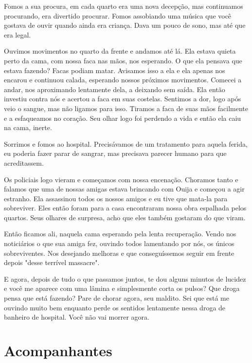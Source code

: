 \documentclass{book}
\begin{document}
\begin{multicols}{2}
 Fomos a sua procura, em cada quarto era uma nova decepção, mas continuamos procurando, era divertido procurar. Fomos assobiando uma música que você gostava de ouvir quando ainda era criança. Dava um pouco de sono, mas até que era legal.
 
 Ouvimos movimentos no quarto da frente e andamos até lá. Ela estava quieta perto da cama, com nossa faca nas mãos, nos esperando. O que ela pensava que estava fazendo? Facas podiam matar. Avisamos isso a ela e ela apenas nos encarou e continuou calada, esperando nossos próximos movimentos. Comecei a andar, nos aproximando lentamente dela, a deixando sem saída. Ela então investiu contra nós e acertou a faca em suas costelas. Sentimos a dor, logo após veio o sangue, mas não ligamos para isso. Tiramos a faca de suas mãos facilmente e a esfaqueamos no coração. Seu olhar logo foi perdendo a vida e então ela caiu na cama, inerte.
 
 Sorrimos e fomos ao hospital. Precisávamos de um tratamento para aquela ferida, eu poderia fazer parar de sangrar, mas precisava parecer humano para que acreditassem.
 
 Os policiais logo vieram e começamos com nossa encenação. Choramos tanto e falamos que uma de nossas amigas estava brincando com Ouija e começou a agir estranho. Ela assassinou todos os nossos amigos e eu tive que mata-la para sobreviver. Eles então foram para a casa encontraram nossa obra espalhada pelos quartos. Seus olhares de surpresa, acho que eles também gostaram do que viram.
 
 Então ficamos ali, naquela cama esperando pela lenta recuperação. Vendo nos noticiários o que sua amiga fez, ouvindo todos lamentando por nós, os únicos sobreviventes. Nos desejando melhoras e que conseguíssemos seguir em frente depois "desse terrível massacre".
 
 E agora, depois de tudo o que passamos juntos, te dou alguns minutos de lucidez e você me aparece com uma lâmina e simplesmente corta os pulsos? Que droga pensa que está fazendo? Pare de chorar agora, seu maldito. Sei que está me ouvindo muito bem enquanto perde os sentidos lentamente nessa droga de banheiro de hospital. Você não vai morrer agora.
 
\end{multicols}

\section{Acompanhantes}
\end{document}
